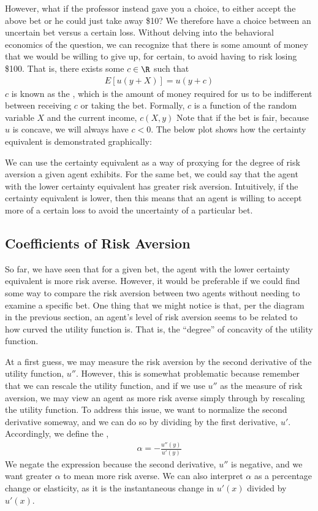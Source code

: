 However, what if the professor instead gave you a choice, to either accept the above bet or he could just take away \$10? We therefore have a choice between an uncertain bet versus a certain loss. Without delving into the behavioral economics of the question, we can recognize that there is some amount of money that we would be willing to give up, for certain, to avoid having to risk losing \$100. That is, there exists some $c \in \R$ such that
\begin{align*}
    E[u(y + X)] = u(y + c)
\end{align*}
$c$ is known as the , which is the amount of money required for us to be indifferent between receiving $c$ or taking the bet. Formally, $c$ is a function of the random variable $X$ and the current income, $c(X, y)$ Note that if the bet is fair, because $u$ is concave, we will always have $c < 0$. The below plot shows how the certainty equivalent is demonstrated graphically:


We can use the certainty equivalent as a way of proxying for the degree of risk aversion a given agent exhibits. For the same bet, we could say that the agent with the lower certainty equivalent has greater risk aversion. Intuitively, if the certainty equivalent is lower, then this means that an agent is willing to accept more of a certain loss to avoid the uncertainty of a particular bet. 

\subsection*{Coefficients of Risk Aversion}
So far, we have seen that for a given bet, the agent with the lower certainty equivalent is more risk averse. However, it would be preferable if we could find some way to compare the risk aversion between two agents without needing to examine a specific bet. One thing that we might notice is that, per the diagram in the previous section, an agent's level of risk aversion seems to be related to how curved the utility function is. That is, the ``degree'' of concavity of the utility function.

At a first guess, we may measure the risk aversion by the second derivative of the utility function, $u''$. However, this is somewhat problematic because remember that we can rescale the utility function, and if we use $u''$ as the measure of risk aversion, we may view an agent as more risk averse simply through by rescaling the utility function. To address this issue, we want to normalize the second derivative someway, and we can do so by dividing by the first derivative, $u'$. Accordingly, we define the ,
\begin{align*}
    \alpha = -\frac{u''(y)}{u'(y)}
\end{align*}
We negate the expression because the second derivative, $u''$ is negative, and we want greater $\alpha$ to mean more risk averse. We can also interpret $\alpha$ as a percentage change or elasticity, as it is the instantaneous change in $u'(x)$ divided by $u'(x)$. 

